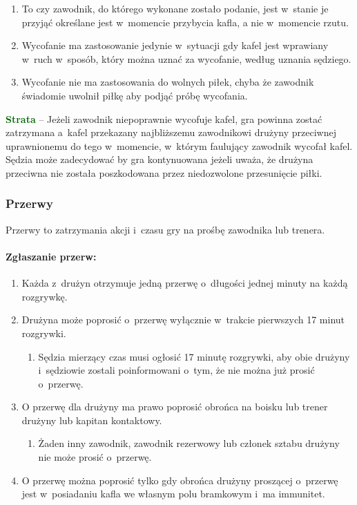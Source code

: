 \documentclass[12pt,a4paper]{article}
\newcommand\other[1]{\bgroup\textcolor{darkgreen}{\textbf{#1}}}
\begin{document}
\begin{enumerate}
	\item
		To czy zawodnik, do którego wykonane zostało podanie,
		jest w~stanie je przyjąć określane jest w~momencie przybycia kafla, a
	      nie w~momencie rzutu.
	\item
	      Wycofanie ma zastosowanie jedynie w~sytuacji gdy kafel jest wprawiany
	      w~ruch w~sposób, który można uznać za wycofanie, według uznania
	      sędziego.
	\item
	      Wycofanie nie ma zastosowania do wolnych piłek, chyba że zawodnik
	      świadomie uwolnił piłkę aby podjąć próbę wycofania.
\end{enumerate}

\other{Strata} -- Jeżeli zawodnik niepoprawnie wycofuje kafel, gra powinna
zostać zatrzymana a~kafel przekazany najbliższemu zawodnikowi drużyny
przeciwnej uprawnionemu do tego w~momencie, w~którym faulujący zawodnik
wycofał kafel. Sędzia może zadecydować by gra kontynuowana jeżeli uważa,
że drużyna przeciwna nie została poszkodowana przez niedozwolone
przesunięcie piłki.

\subsubsection{Przerwy}

Przerwy to zatrzymania akcji i~czasu gry na prośbę zawodnika lub trenera.

\paragraph{Zgłaszanie przerw:}

\begin{enumerate}
	\item
	      Każda z~drużyn otrzymuje jedną przerwę o~długości jednej minuty na
	      każdą rozgrywkę.
	\item
	      Drużyna może poprosić o~przerwę wyłącznie w~trakcie pierwszych 17
	      minut rozgrywki.

	      \begin{enumerate}
		      \item
		            Sędzia mierzący czas musi ogłosić 17 minutę rozgrywki, aby obie
		            drużyny i~sędziowie zostali poinformowani o~tym, że nie można już
		            prosić o~przerwę.
	      \end{enumerate}
	\item
	      O przerwę dla drużyny ma prawo poprosić obrońca na boisku lub trener
	      drużyny lub kapitan kontaktowy.

	      \begin{enumerate}
		      \item
		            Żaden inny zawodnik, zawodnik rezerwowy lub członek sztabu drużyny
		            nie może prosić o~przerwę.
	      \end{enumerate}
	\item
	      O przerwę można poprosić tylko gdy obrońca drużyny proszącej o~przerwę
	      jest w~posiadaniu kafla we własnym polu bramkowym i~ma immunitet.
\end{enumerate}
\end{document}
